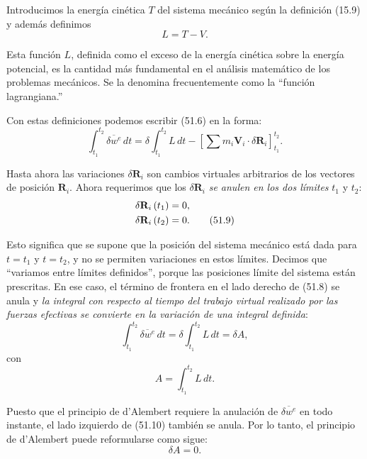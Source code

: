 \documentclass[12pt,a4paper]{book}
\newcommand{\vect}[1]{\mathbf{#1}}
\begin{document}

Introducimos la energía cinética $T$ del sistema mecánico según la definición (15.9) y además definimos
\begin{equation}
L = T - V. \tag{51.7}
\end{equation}

Esta función $L$, definida como el exceso de la energía cinética sobre la energía potencial, es la cantidad más fundamental en el análisis matemático de los problemas mecánicos. Se la denomina frecuentemente como la ``función lagrangiana.''

Con estas definiciones podemos escribir (51.6) en la forma:
\begin{equation}
\int_{t_1}^{t_2} \overline{\delta w^e} \, dt = \delta \int_{t_1}^{t_2} L \, dt - \left[ \sum m_i \vect{V}_i \cdot \delta \vect{R}_i \right]_{t_1}^{t_2}. \tag{51.8}
\end{equation}

Hasta ahora las variaciones $\delta \vect{R}_i$ son cambios virtuales arbitrarios de los vectores de posición $\vect{R}_i$. Ahora requerimos que los $\delta \vect{R}_i$ \textit{se anulen en los dos límites} $t_1$ y $t_2$:
\begin{align}
\delta \vect{R}_i \,(t_1) &= 0, \notag \\
\delta \vect{R}_i \,(t_2) &= 0. \tag{51.9}
\end{align}

Esto significa que se supone que la posición del sistema mecánico está dada para $t = t_1$ y $t = t_2$, y no se permiten variaciones en estos límites. Decimos que ``variamos entre límites definidos'', porque las posiciones límite del sistema están prescritas. En ese caso, el término de frontera en el lado derecho de (51.8) se anula y \textit{la integral con respecto al tiempo del trabajo virtual realizado por las fuerzas efectivas se convierte en la variación de una integral definida}:
\begin{equation}
\int_{t_1}^{t_2} \overline{\delta w^e} \, dt = \delta \int_{t_1}^{t_2} L \, dt = \delta A, \tag{51.10}
\end{equation}
con
\begin{equation}
A = \int_{t_1}^{t_2} L \, dt. \tag{51.11}
\end{equation}

Puesto que el principio de d'Alembert requiere la anulación de $\overline{\delta w^e}$ en todo instante, el lado izquierdo de (51.10) también se anula. Por lo tanto, el principio de d'Alembert puede reformularse como sigue:
\begin{equation}
\delta A = 0. \tag{51.12}
\end{equation}
\end{document}
